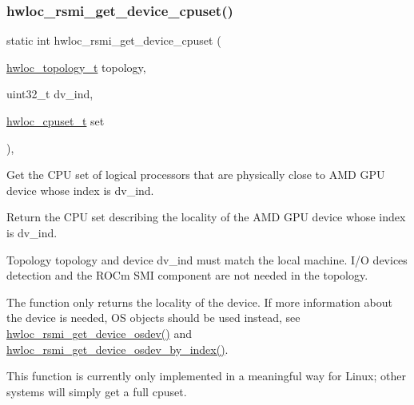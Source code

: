\subsubsection{\texorpdfstring{hwloc\+\_\+rsmi\+\_\+get\+\_\+device\+\_\+cpuset()}{hwloc\_rsmi\_get\_device\_cpuset()}}
{\footnotesize\ttfamily static int hwloc\+\_\+rsmi\+\_\+get\+\_\+device\+\_\+cpuset (\begin{DoxyParamCaption}\item[{\hyperlink{a00186_ga9d1e76ee15a7dee158b786c30b6a6e38}{hwloc\+\_\+topology\+\_\+t}}]{topology,  }\item[{uint32\+\_\+t}]{dv\+\_\+ind,  }\item[{\hyperlink{a00183_ga4bbf39b68b6f568fb92739e7c0ea7801}{hwloc\+\_\+cpuset\+\_\+t}}]{set }\end{DoxyParamCaption})\hspace{0.3cm}{\ttfamily [inline]}, {\ttfamily [static]}}



Get the C\+PU set of logical processors that are physically close to A\+MD G\+PU device whose index is {\ttfamily dv\+\_\+ind}. 

Return the C\+PU set describing the locality of the A\+MD G\+PU device whose index is {\ttfamily dv\+\_\+ind}.

Topology {\ttfamily topology} and device {\ttfamily dv\+\_\+ind} must match the local machine. I/O devices detection and the R\+O\+Cm S\+MI component are not needed in the topology.

The function only returns the locality of the device. If more information about the device is needed, OS objects should be used instead, see \hyperlink{a00222_gaba05bf9710655bb5b1439bee654340ba}{hwloc\+\_\+rsmi\+\_\+get\+\_\+device\+\_\+osdev()} and \hyperlink{a00222_ga507d0acdd5e9ac374a8d120d59604c80}{hwloc\+\_\+rsmi\+\_\+get\+\_\+device\+\_\+osdev\+\_\+by\+\_\+index()}.

This function is currently only implemented in a meaningful way for Linux; other systems will simply get a full cpuset. \mbox{\label{a00222_gaba05bf9710655bb5b1439bee654340ba}} 
